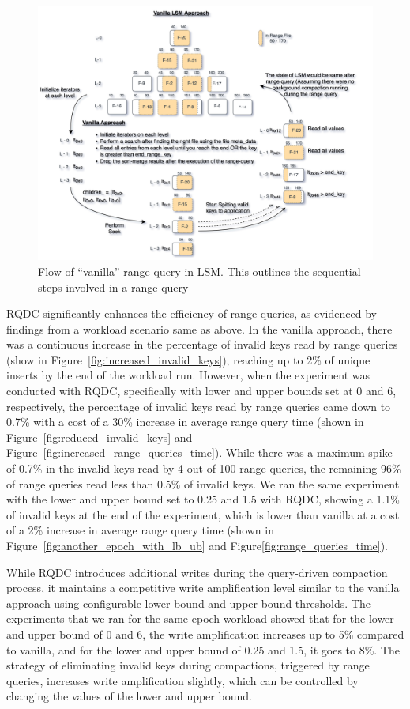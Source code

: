 \begin{figure}
    \includegraphics[scale=0.11]{Figures/Vanilla Range Query vanilla.png}
    \caption{Flow of ``vanilla'' range query in LSM. This outlines the sequential steps involved in a range 
    query}\label{fig:vanilla_range_query}
\end{figure}

RQDC significantly enhances the efficiency of range queries, as evidenced by findings from a workload scenario same as 
above. In the vanilla approach, there was a continuous increase in the 
percentage of invalid keys read by range queries (show in Figure~\ref{fig:increased_invalid_keys}), reaching up to 2\% of unique inserts by the end of the workload run. 
However, when the experiment was conducted with RQDC, specifically with lower and upper bounds set at 0 and 6, 
respectively, the percentage of invalid keys read by range queries came down to 0.7\% with a cost of a 30\% increase in 
average range query time (shown in Figure~\ref{fig:reduced_invalid_keys} and Figure~\ref{fig:increased_range_queries_time}). 
While there was a maximum spike of 0.7\% in the invalid keys read by 4 out of 100 range 
queries, the remaining 96\% of range queries read less than 0.5\% of invalid keys. We ran the same experiment with the 
lower and upper bound set to 0.25 and 1.5 with RQDC, showing a 1.1\% of invalid keys at the end of the experiment, 
which is lower than vanilla at a cost of a 2\% increase in average range query time (shown in Figure~\ref{fig:another_epoch_with_lb_ub} and Figure\ref{fig:range_queries_time}).

While RQDC introduces additional writes during the query-driven compaction process, it maintains a competitive write 
amplification level similar to the vanilla approach using configurable lower bound and upper bound thresholds. The 
experiments that we ran for the same epoch workload showed that for the lower and upper bound of 0 and 6, the 
write amplification increases up to 5\% compared to vanilla, and for the lower and upper bound of 0.25 and 1.5, it
goes to 8\%. The strategy of eliminating invalid keys during compactions, triggered by range queries, increases write 
amplification slightly, which can be controlled by changing the values of the lower and upper bound.
